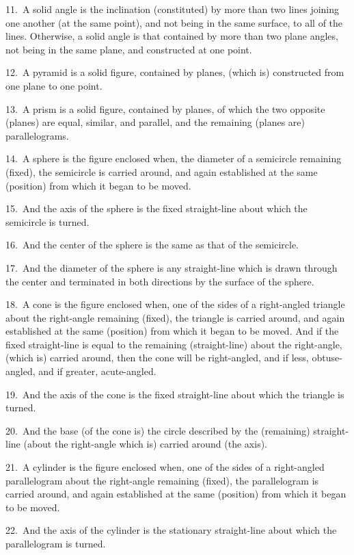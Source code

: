 11.~A solid angle is the inclination (constituted) by more than two lines joining one another (at the same point), and
not being in the same surface, to all of the lines. Otherwise,
a solid angle is that contained by more than two plane angles, not being
in the same plane, and constructed at one point.

12.~A pyramid is a solid figure, contained by planes, (which is) constructed from one plane to
one  point.

13.~A prism is a solid figure, contained by planes, of which the two opposite
(planes)
are equal, similar, and parallel, and the remaining (planes are) parallelograms.

14.~A sphere is the figure enclosed when, the diameter of a semicircle remaining (fixed), the semicircle is carried around,
 and  again established at the same (position) from which it began to be moved.
 
15.~And the axis of the sphere is the fixed straight-line about
 which the semicircle is turned.
 
16.~And the center of the sphere is the same as that of the semicircle.

17.~And the diameter of the sphere is any straight-line which is
 drawn through the center and terminated in both directions by
 the surface of the sphere.
 
18.~A cone is the figure enclosed when,  one of the sides of a right-angled triangle about the right-angle remaining (fixed),
  the triangle is carried around, and again established at the
 same (position) from which it began to be moved. And if the
 fixed straight-line is equal to the remaining (straight-line) about the
 right-angle, (which is) carried around, then the cone will be right-angled, and
 if less, obtuse-angled, and if greater, acute-angled.
 
19.~And the axis of the cone is the fixed straight-line about which
 the triangle is turned.
 
20.~And the base (of the cone is) the circle described by the (remaining) straight-line (about the right-angle which is)
 carried around (the axis).
 
21.~A cylinder is the figure enclosed when, one of the sides
 of a right-angled parallelogram about the right-angle remaining (fixed),
 the parallelogram is carried around, and again established at the same
 (position) from which it began to be moved.
 
22.~And the axis of the cylinder is the stationary straight-line about which
 the parallelogram is turned.
 
